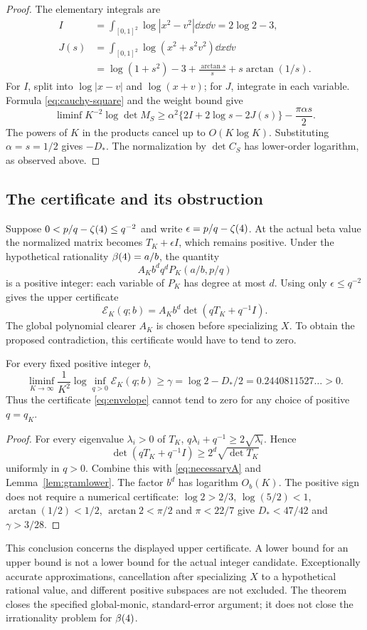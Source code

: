 \begin{proof}
The elementary integrals are
\begin{align*}
 I&=\int_{[0,1]^2}\log|x^2-v^2|\dd x\dd v=2\log2-3,\\
 J(s)&=\int_{[0,1]^2}\log(x^2+s^2v^2)\dd x\dd v\\
 &=\log(1+s^2)-3+\frac{\arctan s}{s}+s\arctan(1/s).
\end{align*}
For $I$, split into $\log|x-v|$ and $\log(x+v)$; for $J$, integrate
in each variable. Formula \eqref{eq:cauchy-square} and the weight
bound give
\[
 \liminf K^{-2}\log\det M_S
 \geq\alpha^2\{2I+2\log s-2J(s)\}-\frac{\pi\alpha s}{2}.
\]
The powers of $K$ in the products cancel up to $O(K\log K)$.
Substituting $\alpha=s=1/2$ gives $-D_*$. The normalization by
$\det C_S$ has lower-order logarithm, as observed above.
\end{proof}

\subsection{The certificate and its obstruction}
Suppose $0<p/q-\zeta(4)\leq q^{-2}$ and write $\epsilon=p/q-\zeta(4)$.
At the actual beta value the normalized matrix becomes
$T_K+\epsilon I$, which remains positive. Under the hypothetical
rationality $\beta(4)=a/b$, the quantity
\[
 A_Kb^dq^dP_K(a/b,p/q)
\]
is a positive integer: each variable of $P_K$ has degree at most $d$.
Using only $\epsilon\leq q^{-2}$ gives the upper certificate
\begin{equation}\label{eq:envelope}
 \mathcal E_K(q;b)=A_Kb^d\det(qT_K+q^{-1}I).
\end{equation}
The global polynomial clearer $A_K$ is chosen before specializing $X$.
To obtain the proposed contradiction, this certificate would have to
tend to zero.

\begin{theorem}\label{thm:proxy}
For every fixed positive integer $b$,
\begin{equation}\label{eq:proxy-rate}
 \liminf_{K\to\infty}\frac1{K^2}
       \log\inf_{q>0}\mathcal E_K(q;b)
 \geq\gamma=\log2-D_*/2=0.2440811527\ldots>0.
\end{equation}
Thus the certificate \eqref{eq:envelope} cannot tend to zero for any
choice of positive $q=q_K$.
\end{theorem}
\begin{proof}
For every eigenvalue $\lambda_i>0$ of $T_K$,
$q\lambda_i+q^{-1}\geq2\sqrt{\lambda_i}$. Hence
\[
 \det(qT_K+q^{-1}I)\geq2^d\sqrt{\det T_K}
\]
uniformly in $q>0$. Combine this with \eqref{eq:necessaryA} and
Lemma~\ref{lem:gramlower}. The factor $b^d$ has logarithm $O_b(K)$.
The positive sign does not require a numerical certificate:
$\log2>2/3$, $\log(5/2)<1$, $\arctan(1/2)<1/2$,
$\arctan2<\pi/2$ and $\pi<22/7$ give $D_*<47/42$ and
$\gamma>3/28$.
\end{proof}

This conclusion concerns the displayed upper certificate. A lower
bound for an upper bound is not a lower bound for the actual integer
candidate. Exceptionally accurate approximations, cancellation after
specializing $X$ to a hypothetical rational value, and different
positive subspaces are not excluded. The theorem closes the specified
global-monic, standard-error argument; it does not close the
irrationality problem for $\beta(4)$.
